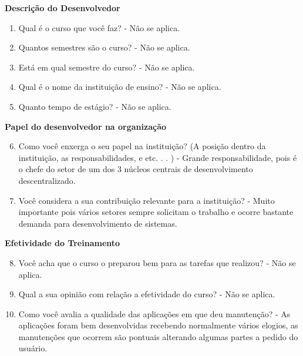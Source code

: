 \begin{apendicesenv}
\textbf{Descrição do Desenvolvedor}

\begin{enumerate}
	\item Qual é o curso que você faz?\newline
	- Não se aplica.
	\item Quantos semestres são o curso?\newline
	- Não se aplica.
	\item Está em qual semestre do curso?\newline
	- Não se aplica.
	\item Qual é o nome da instituição de ensino?\newline
	- Não se aplica.
	\item Quanto tempo de estágio?\newline
	- Não se aplica.
\end{enumerate}

\textbf{Papel do desenvolvedor na organização}

\begin{enumerate}
	\setcounter{enumi}{5}
	\item Como você enxerga o seu papel na instituição? (A posição dentro da instituição, as
	responsabilidades, e etc. . . )\newline
	-  Grande responsabilidade, pois é o chefe do setor de um dos 3 núcleos centrais de desenvolvimento descentralizado.
	\item Você considera a sua contribuição relevante para a instituição?\newline
	- Muito importante pois vários setores sempre solicitam o trabalho e ocorre bastante demanda para desenvolvimento de sistemas.
\end{enumerate}

\textbf{Efetividade do Treinamento}

\begin{enumerate}
	\setcounter{enumi}{7}
	\item Você acha que o curso o preparou bem para as tarefas que realizou?\newline
	- Não se aplica.
	\item Qual a sua opinião com relação a efetividade do curso?\newline
	- Não se aplica.
	\item Como você avalia a qualidade das aplicações em que deu manutenção?\newline
	- As aplicações foram bem desenvolvidas recebendo normalmente vários elogios, as manutenções que ocorrem são pontuais alterando algumas partes a pedido do usuário.
\end{enumerate}


\end{apendicesenv}
